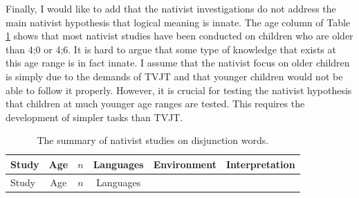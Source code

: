 \documentclass[oneside]{report}
\theoremstyle{definition}
\theoremstyle{definition}
\theoremstyle{definition}
\theoremstyle{remark}
\begin{document}
Finally, I would like to add that the nativist investigations do not
address the main nativist hypothesis that logical meaning is innate. The
age column of Table \ref{tab:nativtable} shows that most nativist
studies have been conducted on children who are older than 4;0 or 4;6.
It is hard to argue that some type of knowledge that exists at this age
range is in fact innate. I assume that the nativist focus on older
children is simply due to the demands of TVJT and that younger children
would not be able to follow it properly. However, it is crucial for
testing the nativist hypothesis that children at much younger age ranges
are tested. This requires the development of simpler tasks than TVJT.
\begin{longtable}[]{@{}lccclc@{}}
\caption{\label{tab:nativtable} The summary of nativist studies on
disjunction words.}\tabularnewline
\toprule
\begin{minipage}[b]{0.23\columnwidth}\raggedright\strut
Study\strut
\end{minipage} & \begin{minipage}[b]{0.07\columnwidth}\centering\strut
Age\strut
\end{minipage} & \begin{minipage}[b]{0.05\columnwidth}\centering\strut
\(n\)\strut
\end{minipage} & \begin{minipage}[b]{0.10\columnwidth}\centering\strut
Languages\strut
\end{minipage} & \begin{minipage}[b]{0.25\columnwidth}\raggedright\strut
Environment\strut
\end{minipage} & \begin{minipage}[b]{0.13\columnwidth}\centering\strut
Interpretation\strut
\end{minipage}\tabularnewline
\midrule
\endfirsthead
\toprule
\begin{minipage}[b]{0.23\columnwidth}\raggedright\strut
Study\strut
\end{minipage} & \begin{minipage}[b]{0.07\columnwidth}\centering\strut
Age\strut
\end{minipage} & \begin{minipage}[b]{0.05\columnwidth}\centering\strut
\(n\)\strut
\end{minipage} & \begin{minipage}[b]{0.10\columnwidth}\centering\strut
Languages\strut
\end{minipage} & \begin{minipage}[b]{0.25\columnwidth}\raggedright\strut

\end{minipage}
\end{longtable}
\end{document}
